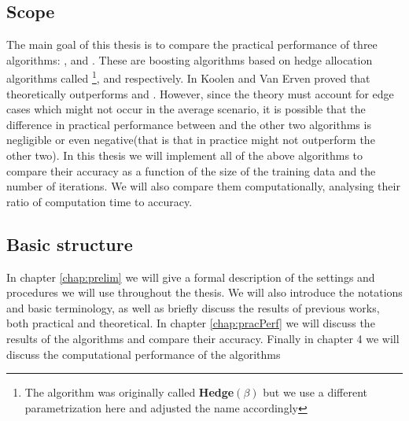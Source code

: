 \subsection{Scope}
The main goal of this thesis is to compare the practical performance of three algorithms: \adaB, \NHB and \squintB. These are boosting algorithms based on hedge allocation algorithms called \hedge\footnote{The algorithm was originally called \textbf{Hedge}$(\beta)$ but we use a different parametrization here and adjusted the name accordingly}, \adaN and \squint respectively. In \cite{Koolen2015} Koolen and Van Erven proved that \squint theoretically outperforms \hedge and \adaN. However, since the theory must account for edge cases which might not occur in the average scenario, it is possible that the difference in practical performance between \squint and the other two algorithms is negligible or even negative(that is that in practice \squintB might not outperform the other two). In this thesis we will implement all of the above algorithms to compare their accuracy as a function of the size of the training data and the number of iterations. We will also compare them computationally, analysing their ratio of computation time to accuracy.  

\subsection{Basic structure}
In chapter \ref{chap:prelim} we will give a formal description of the settings and procedures we will use throughout the thesis. We will also introduce the notations and basic terminology, as well as briefly discuss the results of previous works, both practical and theoretical. In chapter \ref{chap:pracPerf} we will discuss the results of the algorithms and compare their accuracy. Finally in chapter 4 we will discuss the computational performance of the algorithms    
